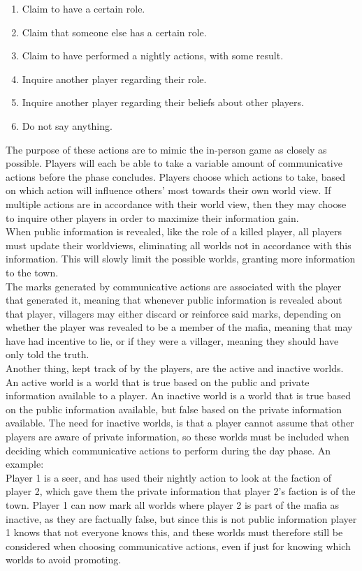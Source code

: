 \begin{enumerate}
    \item Claim to have a certain role.
    \item Claim that someone else has a certain role.
    \item Claim to have performed a nightly actions, with some result.
    \item Inquire another player regarding their role.
    \item Inquire another player regarding their beliefs about other players.
    \item Do not say anything.
\end{enumerate}
The purpose of these actions are to mimic the in-person game as closely as
possible. Players will each be able to take a variable amount of communicative 
actions before the
phase concludes. Players choose which actions to take, based on which action
will influence others’ most towards their own world view. If multiple actions
are in accordance with their world view, then they may choose to inquire other
players in order to maximize their information gain. \\ When public information is
revealed, like the role of a killed player, all players must update their
worldviews, eliminating all worlds not in accordance with this information.
This will slowly limit the possible worlds, granting more information to the
town. \\ The marks generated by communicative actions are associated with the
player that generated it, meaning that whenever public information is revealed
about that player, villagers may either discard or reinforce said marks,
depending on whether the player was revealed to be a member of the mafia,
meaning that may have had incentive to lie, or if they were a villager, meaning
they should have only told the truth. \\ Another thing, kept track of by the
players, are the active and inactive worlds. An active world is a world that is
true based on the public and private information available to a player. An
inactive world is a world that is true based on the public information
available, but false based on the private information available. The need for
inactive worlds, is that a player cannot assume that other players are aware of
private information, so these worlds must be included when deciding which
communicative actions to perform during the day phase. An example: \\ Player 1 is
a seer, and has used their nightly action to look at the faction of player 2,
which gave them the private information that player 2's faction is of the town.
Player 1 can now mark all worlds where player 2 is part of the mafia as
inactive, as they are factually false, but since this is not public information
player 1 knows that not everyone knows this, and these worlds must therefore
still be considered when choosing communicative actions, even if just for
knowing which worlds to avoid promoting.
